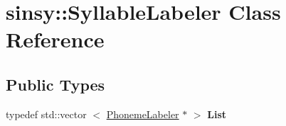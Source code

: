 \hypertarget{classsinsy_1_1SyllableLabeler}{\section{sinsy\-:\-:\-Syllable\-Labeler \-Class \-Reference}
\label{classsinsy_1_1SyllableLabeler}
}
\subsection*{\-Public \-Types}
\begin{DoxyCompactItemize}
\item 
\hypertarget{classsinsy_1_1SyllableLabeler_a4a55b1a946d8bde28811af03dac0b52a}{typedef std\-::vector\*
$<$ \hyperlink{classsinsy_1_1PhonemeLabeler}{\-Phoneme\-Labeler} $\ast$ $>$ {\bfseries \-List}}\label{classsinsy_1_1SyllableLabeler_a4a55b1a946d8bde28811af03dac0b52a}

\end{DoxyCompactItemize}
